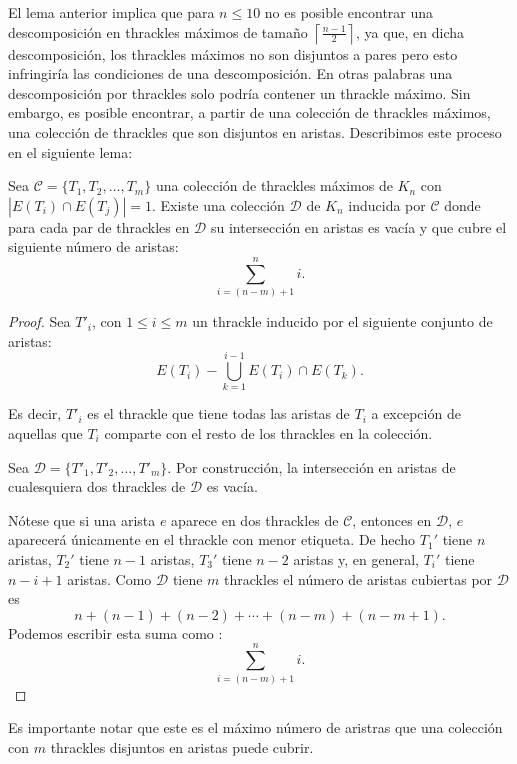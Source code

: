 El lema anterior implica que para $n\leq 10$ no es posible encontrar una
descomposición en thrackles máximos de tamaño
$\left\lceil\frac{n-1}{2}\right\rceil$, ya que, en dicha descomposición, los
thrackles máximos no son disjuntos a pares pero esto infringiría las
condiciones de una descomposición.
En otras palabras una descomposición por thrackles solo podría contener un
thrackle máximo. Sin embargo, es posible encontrar, a partir de una colección
de thrackles máximos, una colección de thrackles que son disjuntos en aristas.
Describimos este proceso en el siguiente lema:
\begin{lemma}\label{lema:existedescomp}
  Sea $\mathcal{C}=\{T_1,T_2,\dots,T_m\}$ una colección de thrackles máximos
  de $K_n$ con $|E(T_i)\cap E(T_j)| = 1$.
  Existe una colección $\mathcal{D}$ de $K_n$ inducida por $\mathcal{C}$ donde
  para cada par de thrackles en $\mathcal{D}$ su intersección en aristas es
  vacía y que cubre el siguiente número de aristas:
  \[\displaystyle \sum^n_{i=(n-m) + 1}i.\]
\end{lemma}
\begin{proof}
  Sea $T'_i$, con $1 \leq i \leq m$ un thrackle inducido por el siguiente
  conjunto de aristas:
  \[E(T_i) - \bigcup_{k=1}^{i-1} E(T_i)\cap E(T_k).\]

  Es decir, $T'_i$ es el thrackle que tiene todas las aristas de $T_i$
  a excepción de aquellas que $T_i$ comparte con el resto de los thrackles
  en la colección.

  Sea $\mathcal{D}=\{T'_1,T'_2,\dots,T'_m\}$. Por construcción, la intersección
  en aristas de cualesquiera dos thrackles de $\mathcal{D}$ es vacía.

  Nótese que si una arista $e$ aparece en dos thrackles de $\mathcal{C}$,
  entonces en $\mathcal{D}$, $e$ aparecerá únicamente en el thrackle con menor
  etiqueta.
  De hecho $T_1'$ tiene $n$ aristas, $T_2'$ tiene $n-1$ aristas, $T_3'$ tiene
  $n-2$ aristas y, en general, $T_i'$ tiene $n-i+1$ aristas. Como $\mathcal{D}$
  tiene $m$ thrackles el número de aristas cubiertas por $\mathcal{D}$ es
  \[ n + (n-1) + (n-2) + \cdots + (n-m) + (n - m + 1).\]
  Podemos escribir esta suma como :
  \[\displaystyle \sum^n_{i=(n-m) + 1}i.\]
\end{proof}
Es importante notar que este es el máximo número de aristras que una colección con $m$ thrackles disjuntos en aristas puede cubrir.

